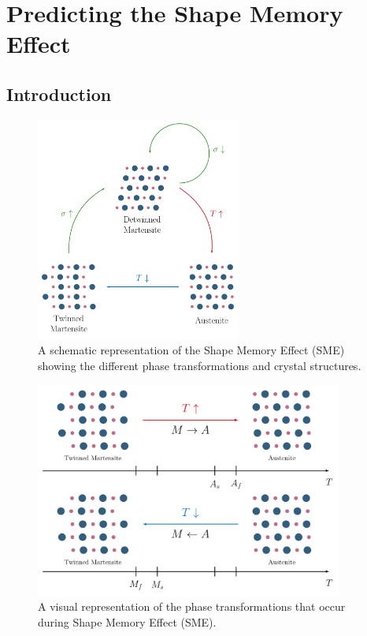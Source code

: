 
\chapter{Predicting the Shape Memory Effect}\label{chap:sma-model}
\section{Introduction}
\begin{figure}[hbt]
    \centering
    \includegraphics[width=0.6\textwidth]{images/chap2/sma-phases.pdf}
    \caption{A schematic representation of the Shape Memory Effect (SME) showing the different phase transformations and crystal structures.}
    \label{fig:sma-phases}
\end{figure}

\begin{figure}[hbt]
    \centering
    \includegraphics[width=0.9\textwidth]{images/chap2/sma-phase-transformations.pdf}
    \caption{A visual representation of the phase transformations that occur during Shape Memory Effect (SME).}
    \label{fig:sma-phase-transformations}
\end{figure}
